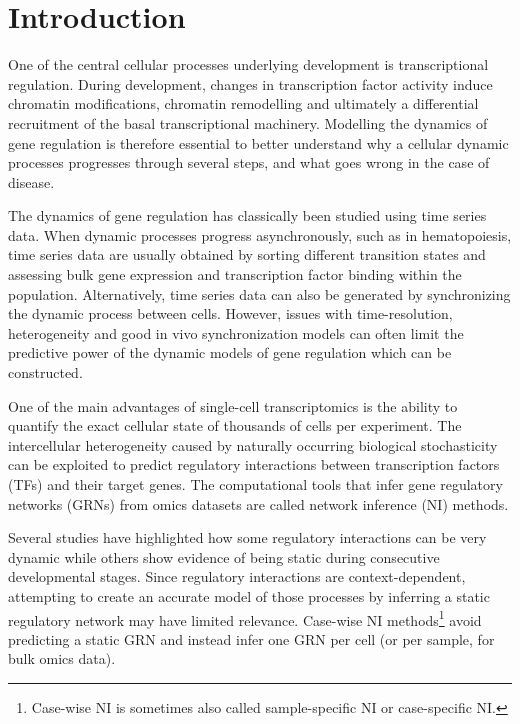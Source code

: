 
\section{Introduction}

One of the central cellular processes underlying development is transcriptional regulation. During development, changes in transcription factor activity induce chromatin modifications, chromatin remodelling and ultimately a differential recruitment of the basal transcriptional machinery\cite{coulon_eukaryotictranscriptionaldynamics_2013}. Modelling the dynamics of gene regulation is therefore essential to better understand why a cellular dynamic processes progresses through several steps, and what goes wrong in the case of disease.

The dynamics of gene regulation has classically been studied using time series data\cite{bar-joseph_studyingmodellingdynamic_2012}. When dynamic processes progress asynchronously, such as in hematopoiesis, time series data are usually obtained by sorting different transition states and assessing bulk gene expression and transcription factor binding within the population\cite{novershtern_denselyinterconnectedtranscriptional_2011, may_dynamicanalysisgene_2013, jojic_identificationtranscriptionalregulators_2013, goode_dynamicgeneregulatory_2016}. Alternatively, time series data can also be generated by synchronizing the dynamic process between cells. However, issues with time-resolution, heterogeneity and good in vivo synchronization models can often limit the predictive power of the dynamic models of gene regulation which can be constructed\cite{bar-joseph_studyingmodellingdynamic_2012}.

One of the main advantages of single-cell transcriptomics is the ability to quantify the exact cellular state of thousands of cells per experiment. The intercellular heterogeneity caused by naturally occurring biological stochasticity \cite{padovan-merhar_usingvariabilitygene_2013} can be exploited to predict regulatory interactions between transcription factors (TFs) and their target genes. The computational tools that infer gene regulatory networks (GRNs) from omics datasets are called network inference (NI) methods.

Several studies have highlighted how some regulatory interactions can be very dynamic while others show evidence of being static during consecutive developmental stages\cite{moignard_characterizationtranscriptionalnetworks_2013, pina_singlecellnetworkanalysis_2015}. 
Since regulatory interactions are context-dependent\cite{papp_genomewideanalysiscontextdependence_2005}, attempting to create an accurate model of those processes by inferring a static regulatory network may have limited relevance.
Case-wise NI methods\footnote{Case-wise NI is sometimes also called sample-specific NI or case-specific NI.} avoid predicting a static GRN and instead infer one GRN per cell (or per sample, for bulk omics data).


